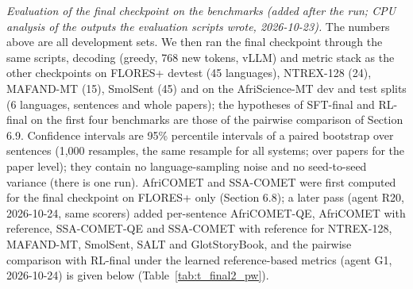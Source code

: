 \emph{Evaluation of the final checkpoint on the benchmarks (added after the run; CPU analysis of the outputs the evaluation scripts wrote, 2026-10-23).} The numbers above are all development sets. We then ran the final checkpoint through the same scripts, decoding (greedy, 768 new tokens, vLLM) and metric stack as the other checkpoints on FLORES+ devtest (45 languages), NTREX-128 (24), MAFAND-MT (15), SmolSent (45) and on the AfriScience-MT dev and test splits (6 languages, sentences and whole papers); the hypotheses of SFT-final and RL-final on the first four benchmarks are those of the pairwise comparison of Section 6.9. Confidence intervals are 95\% percentile intervals of a paired bootstrap over sentences (1,000 resamples, the same resample for all systems; over papers for the paper level); they contain no language-sampling noise and no seed-to-seed variance (there is one run). AfriCOMET and SSA-COMET were first computed for the final checkpoint on FLORES+ only (Section 6.8); a later pass (agent R20, 2026-10-24, same scorers) added per-sentence AfriCOMET-QE, AfriCOMET with reference, SSA-COMET-QE and SSA-COMET with reference for NTREX-128, MAFAND-MT, SmolSent, SALT and GlotStoryBook, and the pairwise comparison with RL-final under the learned reference-based metrics (agent G1, 2026-10-24) is given below (Table~\ref{tab:t_final2_pw}).

